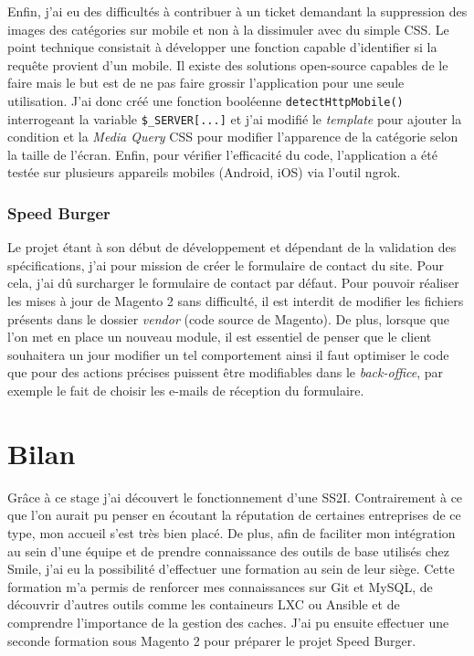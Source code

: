 \documentclass[12pt, a4paper, twoside]{report}
\begin{document}
Enfin, j'ai eu des difficultés à contribuer à un ticket demandant la suppression des images des catégories sur mobile et non à la dissimuler avec du simple CSS. Le point technique consistait à développer une fonction capable d'identifier si la requête provient d'un mobile. Il existe des solutions open-source capables de le faire mais le but est de ne pas faire grossir l'application pour une seule utilisation. J'ai donc créé une fonction booléenne \texttt{detectHttpMobile()} interrogeant la variable \texttt{\$\_SERVER[...]} et j'ai modifié le \textit{template} pour ajouter la condition et la \textit{Media Query} CSS pour modifier l'apparence de la catégorie selon la taille de l'écran. Enfin, pour vérifier l'efficacité du code, l'application a été testée sur plusieurs appareils mobiles (Android, iOS) via l'outil ngrok.

\subsection{Speed Burger}

Le projet étant à son début de développement et dépendant de la validation des spécifications, j'ai pour mission de créer le formulaire de contact du site. Pour cela, j'ai dû surcharger le formulaire de contact par défaut. Pour pouvoir réaliser les mises à jour de Magento 2 sans difficulté, il est interdit de modifier les fichiers présents dans le dossier \textit{vendor} (code source de Magento). De plus, lorsque que l'on met en place un nouveau module, il est essentiel de penser que le client souhaitera un jour modifier un tel comportement ainsi il faut optimiser le code que pour des actions précises puissent être modifiables dans le \textit{back-office}, par exemple le fait de choisir les e-mails de réception du formulaire. \\

\chapter{Bilan}

Grâce à ce stage j'ai découvert le fonctionnement d'une SS2I. Contrairement à ce que l'on aurait pu penser en écoutant la réputation de certaines entreprises de ce type, mon accueil s'est très bien placé. De plus, afin de faciliter mon intégration au sein d'une équipe et de prendre connaissance des outils de base utilisés chez Smile, j'ai eu la possibilité d'effectuer une formation au sein de leur siège. Cette formation m'a permis de renforcer mes connaissances sur Git et MySQL, de découvrir d'autres outils comme les containeurs LXC ou Ansible et de comprendre l'importance de la gestion des caches. J'ai pu ensuite effectuer une seconde formation sous Magento 2 pour préparer le projet Speed Burger. \\
\end{document}
